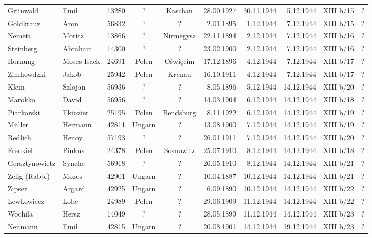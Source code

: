\documentclass[a4paper,12pt,ngerman,
]{nisebook}
\begin{document}
\begin{tiny}
\begin{longtable}[l]{|l|l|r|c|c|r|r|r|c|r|}
Grünwald  &  Emil  & 13280 &  ?  &  Kaschan  & 28.00.1927 & 30.11.1944 & 5.12.1944 &  XIII b/15  &  ? \\[3pt]
Goldkrauz  &  Aron  & 56832 &  ?  &  ?  & 2.01.1895 & 1.12.1944 & 7.12.1944 &  XIII b/15  &  ? \\[3pt]
Nemeti  &  Moritz  & 13866 &  ?  &  Nirmegysz  & 22.11.1894 & 2.12.1944 & 7.12.1944 &  XIII b/16  &  ? \\[3pt]
Steinberg  &  Abraham  & 14300 &  ?  &  ?  & 23.02.1900 & 2.12.1944 & 7.12.1944 &  XIII b/16  &  ? \\[3pt]
Hornung  &  Moses Isack  & 24691 &  Polen  &  Oświęcim  & 17.12.1896 & 4.12.1944 & 7.12.1944 &  XIII b/17  &  ? \\[3pt]
Zimhowdzki  &  Jakob  & 25942 &  Polen  &  Krenau  & 16.10.1911 & 4.12.1944 & 7.12.1944 &  XIII b/17  &  ? \\[3pt]
Klein  &  Szlojan  & 56936 &  ?  &  ?  & 8.05.1896 & 5.12.1944 & 14.12.1944 &  XIII b/20  &  ? \\[3pt]
Marokko  &  David  & 56956 &  ?  &  ?  & 14.03.1904 & 6.12.1944 & 14.12.1944 &  XIII b/18  &  ? \\[3pt]
Piarkarski  &  Ekinzier  & 25195 &  Polen  &  Bendsburg  & 8.11.1922 & 6.12.1944 & 14.12.1944 &  XIII b/19  &  ? \\[3pt]
Müller  &  Hermann  & 42811 &  Ungarn  &  ?  & 13.08.1900 & 7.12.1944 & 14.12.1944 &  XIII b/19  &  ? \\[3pt]
Redlich  &  Henoy  & 57193 &  ?  &  ?  & 26.01.1911 & 7.12.1944 & 14.12.1944 &  XIII b/20  &  ? \\[3pt]
Freukiel  &  Pinkus  & 24378 &  Polen  &  Sosnowitz  & 25.07.1910 & 8.12.1944 & 14.12.1944 &  XIII b/18  &  ? \\[3pt]
Gersztynowietz  &  Synche  & 56918 &  ?  &  ?  & 26.05.1910 & 8.12.1944 & 14.12.1944 &  XIII b/21  &  ? \\[3pt]
Zelig (Rabbi)  &  Mozes  & 42901 &  Ungarn  &  ?  & 10.04.1887 & 10.12.1944 & 14.12.1944 &  XIII b/21  &  ? \\[3pt]
Zipser  &  Argard  & 42925 &  Ungarn  &  ?  & 6.09.1890 & 10.12.1944 & 14.12.1944 &  XIII b/22  &  ? \\[3pt]
Lewkowiecz  &  Lobe  & 24989 &  Polen  &  ?  & 29.06.1909 & 11.12.1944 & 14.12.1944 &  XIII b/22  &  ? \\[3pt]
Wochila  &  Hersz  & 14049 &  ?  &  ?  & 28.05.1899 & 11.12.1944 & 14.12.1944 &  XIII b/23  &  ? \\[3pt]
Neumann  &  Emil  & 42815 &  Ungarn  &  ?  & 20.08.1901 & 14.12.1944 & 19.12.1944 &  XIII b/23  &  ? \\[3pt]

\end{longtable}
\end{tiny}
\end{document}
